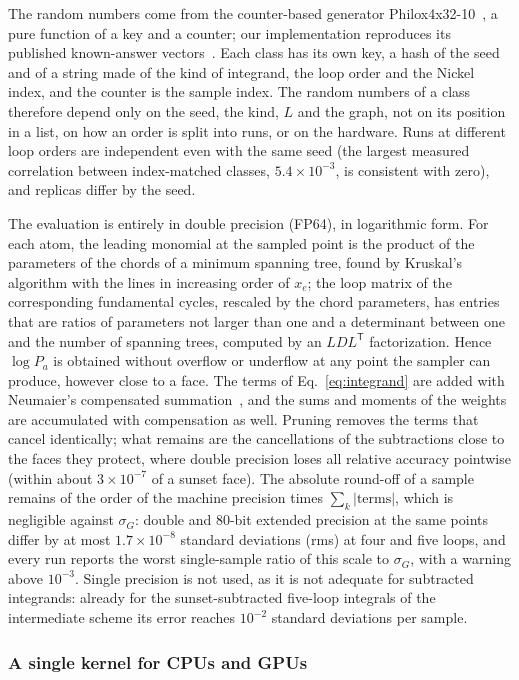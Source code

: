 The random numbers come from the counter-based generator Philox4x32-10~\cite{Salmon2011Random123}, a pure function of a
key and a counter; our implementation reproduces its published known-answer vectors~. Each class has its own key, a hash of
the seed and of a string made of the kind of integrand, the loop order and the Nickel index, and the counter is the sample
index. The random numbers of a class therefore depend only on the seed, the kind, $L$ and the graph, not on its position in
a list, on how an order is split into runs, or on the hardware. Runs at different loop orders are independent even with the
same seed (the largest measured correlation between index-matched classes, $5.4\times10^{-3}$, is consistent with zero), and replicas differ by the seed.

The evaluation is entirely in double precision (FP64), in logarithmic form. For each atom, the leading monomial at the
sampled point is the product of the parameters of the chords of a minimum spanning tree, found by Kruskal's algorithm with
the lines in increasing order of $x_e$; the loop matrix of the corresponding fundamental cycles, rescaled by the chord
parameters, has entries that are ratios of parameters not larger than one and a determinant between one and the number of
spanning trees, computed by an $LDL^{\mathsf T}$ factorization. Hence $\log P_a$ is obtained without overflow or underflow at
any point the sampler can produce, however close to a face. The terms of Eq.~\eqref{eq:integrand} are added with
Neumaier's compensated summation~\cite{Neumaier1974}, and the sums and moments of the weights are accumulated with
compensation as well. Pruning removes the terms that cancel identically; what remains are the cancellations of the
subtractions close to the faces they protect, where double precision loses all relative accuracy pointwise (within
about $3\times10^{-7}$ of a sunset face). The absolute round-off of a sample remains of the order of the machine
precision times $\sum_k|\text{terms}|$, which is negligible against $\sigma_G$: double and 80-bit extended precision at
the same points differ by at most $1.7\times10^{-8}$ standard deviations (rms) at four and five loops, and every run
reports the worst single-sample ratio of this scale to $\sigma_G$, with a warning above $10^{-3}$. Single precision is not
used, as it is not adequate for subtracted integrands: already for the sunset-subtracted five-loop integrals of the
intermediate scheme its error reaches $10^{-2}$ standard deviations per sample.

\subsubsection{A single kernel for CPUs and GPUs}
\label{sec:methods-kernel}

